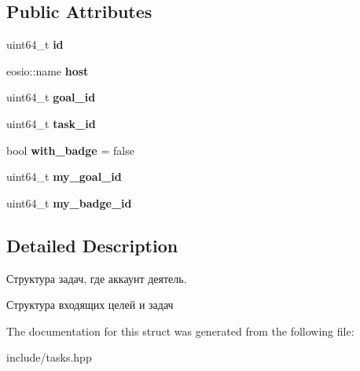 \subsection*{Public Attributes}
\begin{DoxyCompactItemize}
\item 
\mbox{\label{structincoming_a9ee49a4eb869acf3122ebe8285cb4194}} 
uint64\+\_\+t {\bfseries id}
\item 
\mbox{\label{structincoming_a242c3f43114c14b76ec2e7c63d8c231a}} 
eosio\+::name {\bfseries host}
\item 
\mbox{\label{structincoming_ade1b23166cc5f00c5671a4eeb15acd4c}} 
uint64\+\_\+t {\bfseries goal\+\_\+id}
\item 
\mbox{\label{structincoming_a3380ef481a49b4516746460ec43c0ed0}} 
uint64\+\_\+t {\bfseries task\+\_\+id}
\item 
\mbox{\label{structincoming_a0389fa468d16a51288e568a0eec33e5d}} 
bool {\bfseries with\+\_\+badge} = false
\item 
\mbox{\label{structincoming_a7da14ab3595bd9ddf804e2dfc52513ba}} 
uint64\+\_\+t {\bfseries my\+\_\+goal\+\_\+id}
\item 
\mbox{\label{structincoming_a157d02a8368b540707e942e22d1905e9}} 
uint64\+\_\+t {\bfseries my\+\_\+badge\+\_\+id}
\end{DoxyCompactItemize}


\subsection{Detailed Description}
Структура задач, где аккаунт деятель. 

Структура входящих целей и задач 

The documentation for this struct was generated from the following file\+:\begin{DoxyCompactItemize}
\item 
include/tasks.\+hpp\end{DoxyCompactItemize}
